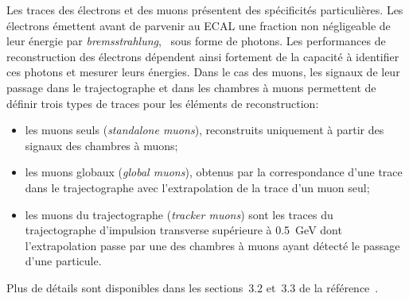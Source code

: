 \par Les traces des électrons et des muons présentent des spécificités particulières.
Les électrons émettent avant de parvenir au ECAL une fraction non négligeable de leur énergie par \emph{bremsstrahlung}, \ie\ sous forme de photons.
Les performances de reconstruction des électrons dépendent ainsi fortement de la capacité à identifier ces photons et mesurer leurs énergies.
Dans le cas des muons, les signaux de leur passage dans le trajectographe et dans les chambres à muons permettent de définir trois types de traces pour les éléments de reconstruction:
\begin{itemize}
\item les muons seuls (\emph{standalone muons}), reconstruits uniquement à partir des signaux des chambres à muons;
\item les muons globaux (\emph{global muons}), obtenus par la correspondance d'une trace dans le trajectographe avec l'extrapolation de la trace d'un muon seul;
\item les muons du trajectographe (\emph{tracker muons}) sont les traces du trajectographe d'impulsion transverse supérieure à \SI{0.5}{\GeV} dont l'extrapolation passe par une des chambres à muons ayant détecté le passage d'une particule.
\end{itemize}
Plus de détails sont disponibles dans les sections~3.2 et~3.3 de la référence~\cite{particle-flow}.
